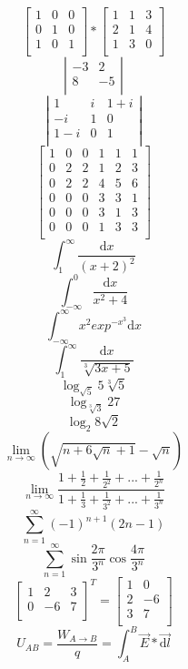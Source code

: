 \documentclass[12pt, letterpaper, titlepage]{article}
\begin{document}
$$\mathbf{}
\left[ \begin{array}{ccc}
1 & 0 & 0 \\
0 & 1 & 0 \\
1 & 0 & 1 \\
\end{array} \right]
*
\mathbf{}
\left[ \begin{array}{ccc}
1 & 1 & 3 \\
2 & 1 & 4 \\
1 & 3 & 0 \\
\end{array} \right]
$$
$$\mathbf{}
\left| \begin{array}{rr}
-3 & 2 \\
8 & -5 \\
\end{array} \right|$$
$$\mathbf{}
\left| \begin{array}{ccc}
1 & i & 1+i\\
-i & 1 & 0 \\
1-i & 0 & 1 \\
\end{array} \right|$$
$$\mathbf{}
\left[ \begin{array}{c|cc|ccc}
1 & 0 & 0 & 1 & 1 & 1\\
\hline
0 & 2 & 2 & 1 & 2 & 3\\
0 & 2 & 2 & 4 & 5 & 6\\
\hline
0 & 0 & 0 & 3 & 3 & 1\\
0 & 0 & 0 & 3 & 1 & 3\\
0 & 0 & 0 & 1 & 3 & 3\\
\end{array} \right]$$
$$ \int_{1}^{\infty} \frac{\mathrm{d} x}{(x+2)^2}$$
$$ \int_{-\infty}^{0} \frac{\mathrm{d} x}{x^2+4}$$
$$ \int_{-\infty}^{\infty} x^2 exp^{-x^3} \mathrm{d}x$$
$$ \int_{1}^{\infty} \frac{\mathrm{d} x}{\sqrt[3]{3x+5}}$$
$$\log_{\sqrt{5}} 5 \sqrt[3]{5}$$
$$\log_{\sqrt[3]{3}} 27$$
$$\log_{2} 8 \sqrt{2}$$
$$\lim_{n \rightarrow \infty}(\sqrt{n+6\sqrt{n}+1}-\sqrt{n}) $$
$$\lim_{n \rightarrow \infty}\frac{1+\frac{1}{2}+\frac{1}{2^2}+...+\frac{1}{2^n}}{1+\frac{1}{3}+\frac{1}{3^2}+...+\frac{1}{3^n}} $$
$$\sum_{n=1}^{\infty}(-1)^{n+1}(2n-1)$$
$$\sum_{n=1}^{\infty} \sin \frac{2 \pi}{3^n} \cos \frac{4 \pi}{3^n}$$
$$\mathbf{}
\left[ \begin{array}{lll}
1 & 2 & 3\\
0 & -6 & 7 \\
\end{array} \right]^T
=
\mathbf{}
\left[ \begin{array}{ll}
1 & 0 \\
2 & -6\\
3 & 7\\
\end{array} \right]
$$
$$U_{AB}=\frac{W_{A \rightarrow B}}{q}=\int_{A}^{B}\vec{E}*\vec{\mathrm{d}l}$$
\end{document}
